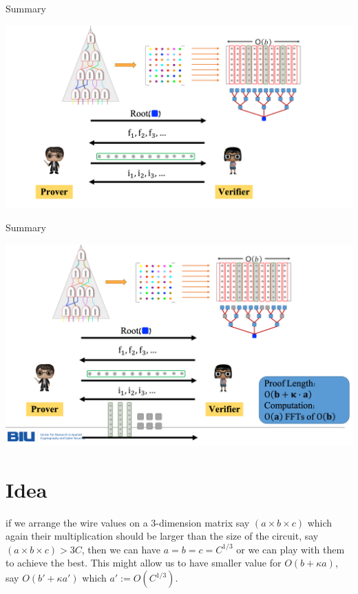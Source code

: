 \documentclass{beamer}
\begin{document}
\begin{frame}{Summary}
	\begin{minipage}{0.42\linewidth}
		\includegraphics[scale=0.26]{l9.png}
	\end{minipage}
\end{frame}


\begin{frame}{Summary}
	\begin{minipage}{0.42\linewidth}
		\includegraphics[scale=0.26]{l10.png}
	\end{minipage}
\end{frame}


\section{Idea}


\begin{frame}
if we arrange the wire values on a 3-dimension matrix say $(a \times b \times c)$ which again their multiplication should be larger than the size of the circuit, say  $(a \times b \times c) > 3C$,
then we can have $a = b = c =C^{1/3}$ or we can play with them to achieve the best. This might allow us to have smaller value for $O(b +\kappa a)$, say $O(b' +\kappa a')$ which $a':= O(C^{1/3})$.
\end{frame}
\end{document}
